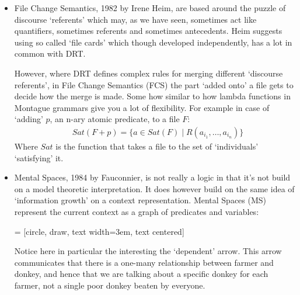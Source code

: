 \documentclass[12pt]{article}
\begin{document}
\begin{itemize}
\item File Change Semantics, 1982 by Irene Heim\cite{heim1983file}, are based around the puzzle of discourse `referents' which may, as we have seen, sometimes act like quantifiers, sometimes referents and sometimes antecedents. Heim suggests using so called `file cards' which though developed independently, has a lot in common with DRT.

However, where DRT defines complex rules for merging different `discourse referents', in File Change Semantics (FCS) the part `added onto' a file gets to decide how the merge is made. Some how similar to how lambda functions in Montague grammars give you a lot of flexibility. For example in case of `adding' $p$, an n-ary atomic predicate, to a file $F$:
%
\begin{align}
&Sat(F + p) = \{a \in Sat(F) \mid R(a_{i_1}, \dots, a_{i_n})\} \nonumber
\end{align}
%
Where $Sat$ is the function that takes a file to the set of `individuals' `satisfying' it.

\item Mental Spaces, 1984 by Fauconnier\cite{fauconnier1984espaces}, is not really a logic in that it's not build on a model theoretic interpretation. It does however build on the same idea of `information growth' on a context representation. Mental Spaces (MS) represent the current context as a graph of predicates and variables:

 = [circle, draw, text width=3em, text centered]

Notice here in particular the interesting the `dependent' arrow. This arrow communicates that there is a one-many relationship between farmer and donkey, and hence that we are talking about a specific donkey for each farmer, not a single poor donkey beaten by everyone.


\end{itemize}
\end{document}
